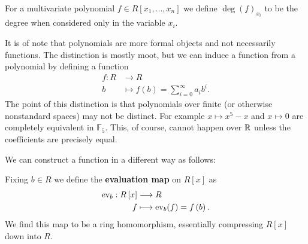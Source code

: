 \begin{definition}
	For a multivariate polynomial \(f \in R\left[ x_1, \ldots, x_{n} \right] \) we define \(\deg \left(  f \right) _{x_{i}}\) to be the degree when considered only in the variable \(x_{i}\).
\end{definition}
\begin{remark}
	It is of note that polynomials are more formal objects and not necessarily functions. The distinction is mostly moot, but we can induce a function from a polynomial by defining a function \begin{align*}
		f: R &\longrightarrow R \\
		b &\longmapsto f(b) = \sum_{i=0}^{\infty} a_{i}b^{i}
	.\end{align*}
	The point of this distinction is that polynomials over finite (or otherwise nonstandard spaces) may not be distinct. For example \(x \mapsto x^{5} - x\) and \(x \mapsto 0\) are completely equivalent in \(\mathbb{F}_5\). This, of course, cannot happen over \(\mathbb{R}\) unless the coefficients are precisely equal.
\end{remark}
We can construct a function in a different way as follows:
\begin{definition}
	Fixing \(b \in R\) we define the \textbf{evaluation map} on \(R\left[ x \right] \)  as \begin{align*}
		\operatorname{ev}_{b}: R\left[ x \right]   &\longrightarrow  R\\
		f &\longmapsto \operatorname{ev}_{b}(f) = f\left( b \right)
	.\end{align*}
	We find this map to be a ring homomorphism, essentially compressing \(R\left[ x \right] \) down into \(R\).
\end{definition}
